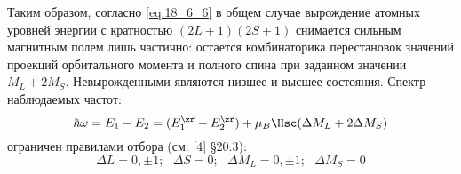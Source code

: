 Таким образом, согласно \eqref{eq:18_6_6} в общем случае вырождение атомных уровней энергии с кратностью $(2L+1)(2S+1)$ снимается сильным магнитным полем лишь частично: остается комбинаторика перестановок значений проекций орбитального момента и полного спина при заданном значении $M_L + 2 M_S$. Невырожденными являются низшее и высшее состояния. Спектр наблюдаемых частот: 
\begin{equation}
\label{eq:18_6_7}
\hbar \omega = E_1 - E_2 = (E_1^\zr -E_2^\zr)  + \mu_B \Hsc (\Delta M_L + 2\Delta M_S)
\end{equation}
ограничен правилами отбора (см. [4] \S 20.3):
$$
\boxed{\Delta L = 0, \pm 1;~~~ \Delta S = 0; ~~~\Delta M_L = 0, \pm 1; ~~~ \Delta M_S = 0}
$$
